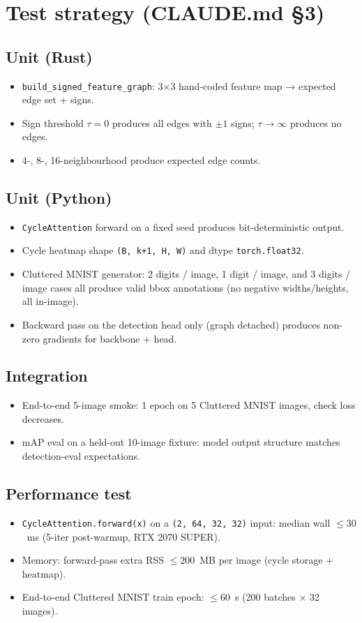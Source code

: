 \documentclass[11pt,a4paper]{article}
\begin{document}
\section{Test strategy (CLAUDE.md \S3)}

\subsection*{Unit (Rust)}
\begin{itemize}
\item \texttt{build\_signed\_feature\_graph}: 3×3 hand-coded feature
  map → expected edge set + signs.
\item Sign threshold $\tau = 0$ produces all edges with $\pm 1$
  signs; $\tau \to \infty$ produces no edges.
\item 4-, 8-, 16-neighbourhood produce expected edge counts.
\end{itemize}

\subsection*{Unit (Python)}
\begin{itemize}
\item \texttt{CycleAttention} forward on a fixed seed produces
  bit-deterministic output.
\item Cycle heatmap shape \texttt{(B, k+1, H, W)} and dtype
  \texttt{torch.float32}.
\item Cluttered MNIST generator: 2 digits / image, 1 digit / image,
  and 3 digits / image cases all produce valid bbox annotations
  (no negative widths/heights, all in-image).
\item Backward pass on the detection head only (graph detached)
  produces non-zero gradients for backbone + head.
\end{itemize}

\subsection*{Integration}
\begin{itemize}
\item End-to-end 5-image smoke: 1 epoch on 5 Cluttered MNIST images,
  check loss decreases.
\item mAP eval on a held-out 10-image fixture: model output structure
  matches detection-eval expectations.
\end{itemize}

\subsection*{Performance test}
\begin{itemize}
\item \texttt{CycleAttention.forward(x)} on a \texttt{(2, 64, 32, 32)}
  input: median wall $\le 30$~ms (5-iter post-warmup, RTX 2070 SUPER).
\item Memory: forward-pass extra RSS $\le 200$~MB per image (cycle
  storage + heatmap).
\item End-to-end Cluttered MNIST train epoch: $\le 60$~s (200 batches
  × 32 images).
\end{itemize}
\end{document}
